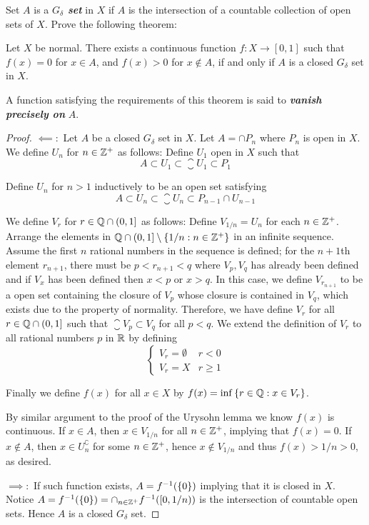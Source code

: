 \documentclass[12pt,a4paper]{article}
\begin{document}
    \begin{ex}
        Set $A$ is a \textbf{\textit{$G_\delta$ set}} in $X$ if $A$ is the intersection of a countable collection of open sets of $X$. Prove the following theorem:

        Let $X$ be normal. There exists a continuous function $f:X\to [0,1]$ such that $f(x)=0$ for $x\in A$, and $f(x)>0$ for $x\notin A$, if and only if $A$ is a closed $G_\delta$ set in $X$.

        A function satisfying the requirements of this theorem is said to \textbf{\textit{vanish precisely on}} $A$.
    \end{ex}
    \begin{proof}
        $\impliedby:$ Let $A$ be a closed $G_\delta$ set in $X$. Let $A=\cap P_n$ where $P_n$ is open in $X$. We define $U_n$ for $n\in\mathbb{Z}^+$ as follows:
        Define $U_1$ open in $X$ such that 
        $$
        A\subset U_1\subset\closure{U_1}\subset P_1
        $$
        
        Define $U_n$ for $n>1$ inductively to be an open set satisfying
        $$
        A\subset U_n\subset\closure{U_n}\subset P_{n-1}\cap U_{n-1}
        $$
        
        We define $V_r$ for $r\in\mathbb{Q}\cap(0,1]$ as follows:
        Define $V_{1/n}=U_n$ for each $n\in\mathbb{Z}^+$. Arrange the elements in $\mathbb{Q}\cap(0,1]\setminus\left\{1/n:n\in\mathbb{Z}^+\right\}$ in an infinite sequence. Assume the first $n$ rational numbers in the sequence is defined; for the $n+1$th element $r_{n+1}$, there must be $p<r_{n+1}<q$ where $V_p,V_q$ has already been defined and if $V_x$ has been defined then $x<p$ or $x>q$. In this case, we define $V_{r_{n+1}}$ to be a open set containing the closure of $V_p$ whose closure is contained in $V_q$, which exists due to the property of normality. Therefore, we have define $V_r$ for all $r\in\mathbb{Q}\cap(0,1]$ such that $\closure{V_p}\subset V_q$ for all $p<q$. We extend the definition of $V_r$ to all rational numbers $p$ in $\mathbb{R}$ by defining
        $$
        \begin{cases}
            V_r=\emptyset& r<0\\
            V_r=X& r\geq1
        \end{cases}
        $$
        
        Finally we define $f(x)$ for all $x\in X$ by $f(x)=\inf\left\{r\in\mathbb{Q}:x\in V_r\right\}$.

        By similar argument to the proof of the Urysohn lemma we know $f(x)$ is continuous. If $x\in A$, then $x\in V_{1/n}$ for all $n\in\mathbb{Z}^+$, implying that $f(x)=0$. If $x\notin A$, then $x\in U_n^\complement$ for some $n\in\mathbb{Z}^+$, hence $x\notin V_{1/n}$ and thus $f(x)>1/n>0$, as desired.
        
        $\implies:$ If such function exists, $A=f^{-1}(\left\{0\right\})$ implying that it is closed in $X$. Notice $A=f^{-1}(\left\{0\right\})=\cap_{n\in\mathbb{Z}^+}f^{-1}([0,1/n))$ is the intersection of countable open sets. Hence $A$ is a closed $G_\delta$ set.
    \end{proof}
\end{document}

